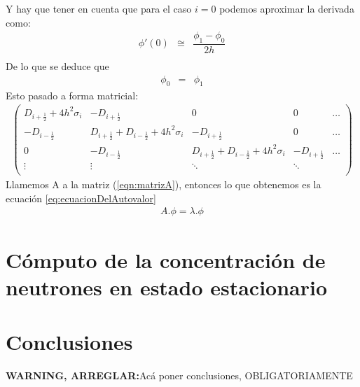 \documentclass[11pt,a4paper]{emulateapj}
\def \warn {{\sffamily\bfseries\large WARNING, ARREGLAR:}}
\begin{document}
Y hay que tener en cuenta que para el caso $i = 0$ podemos aproximar la derivada como:
\begin{eqnarray}
	\phi'(0) &\cong & \dfrac{\phi_1 - \phi_0}{2h} \\
\end{eqnarray}
De lo que se deduce que
\begin{eqnarray}
	\phi_0 &=&\phi_1
\end{eqnarray}
Esto pasado a forma matricial:
\begin{eqnarray}
\label{eqn:matrizA}
	 \left( \begin{array}{ccccc}
		D_{i+\frac{1}{2}} + 4h^2\sigma_i & -D_{i+\frac{1}{2}}  					& 0 		& 0 & \dots \\
		-D_{i-\frac{1}{2}} 		& D_{i+\frac{1}{2}} + D_{i-\frac{1}{2}} + 4h^2\sigma_i 	& -D_{i+\frac{1}{2}} & 0 & \dots \\
		0 & -D_{i-\frac{1}{2}}& D_{i+\frac{1}{2}} + D_{i-\frac{1}{2}} + 4h^2\sigma_i & -D_{i+\frac{1}{2}}  & \dots\\
		\vdots &\vdots&\ddots&\ddots&\\
		\end{array} 
	\right)
\end{eqnarray}
Llamemos A a la matriz (\ref{eqn:matrizA}), entonces lo que obtenemos es la ecuación \ref{eq:ecuacionDelAutovalor}
\begin{eqnarray}
\label{eq:ecuacionDelAutovalor}
A . \phi = \lambda . \phi
\end{eqnarray}



\section{Cómputo de la concentración de neutrones en estado estacionario}
\label{sec:computo}

\section{Conclusiones}
\label{sec:conclusiones}
\warn Acá poner conclusiones, OBLIGATORIAMENTE
%
%

\end{document}
